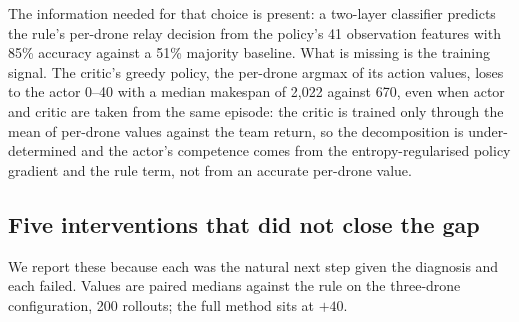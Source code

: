 \documentclass[12pt]{article}
\begin{document}
The information needed for that choice is present: a two-layer classifier predicts the rule's
per-drone relay decision from the policy's 41 observation features with 85\% accuracy against a
51\% majority baseline. What is missing is the training signal. The critic's greedy policy, the
per-drone argmax of its action values, loses to the actor 0--40 with a median makespan of 2{,}022
against 670, even when actor and critic are taken from the same episode: the critic is trained
only through the mean of per-drone values against the team return, so the decomposition is
under-determined and the actor's competence comes from the entropy-regularised policy gradient
and the rule term, not from an accurate per-drone value.

\subsection{Five interventions that did not close the gap}

We report these because each was the natural next step given the diagnosis and each failed.
Values are paired medians against the rule on the three-drone configuration, 200 rollouts; the
full method sits at $+40$.

\begin{table}[h]
\centering
\caption{Training-side interventions aimed at relay assignment. Two seeds each.}
\label{tab:fail}
\end{table}
\end{document}
